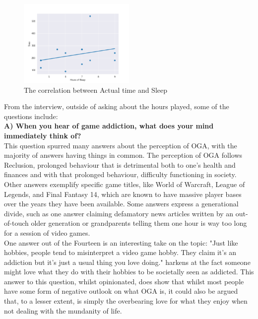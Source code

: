 \documentclass[conference]{IEEEtran}
\begin{document}
\begin{figure}[H]
\includegraphics[width = 0.5\textwidth]{Graph3}
\caption{The correlation between Actual time and Sleep}
\label{tab:figure8}
\end{figure}


From the interview, outside of asking about the hours played, some of the questions include:\\

 \textbf{A) When you hear of game addiction, what does your mind immediately think of?}\\

This question spurred many answers about the perception of OGA, with the majority of answers having things in common. The perception of OGA follows Reclusion, prolonged behaviour that is detrimental both to one's health and finances and with that prolonged behaviour, difficulty functioning in society. Other answers exemplify specific game titles, like World of Warcraft, League of Legends, and Final Fantasy 14, which are known to have massive player bases over the years they have been available. Some answers express a generational divide, such as one answer claiming defamatory news articles written by an out-of-touch older generation or grandparents telling them one hour is way too long for a session of video games.\\

One answer out of the Fourteen is an interesting take on the topic: "Just like hobbies, people tend to misinterpret a video game hobby. They claim it's an addiction but it's just a usual thing you love doing." harkens at the fact someone might love what they do with their hobbies to be societally seen as addicted. This answer to this question, whilst opinionated, does show that whilst most people have some form of negative outlook on what OGA is, it could also be argued that, to a lesser extent, is simply the overbearing love for what they enjoy when not dealing with the mundanity of life.\\
\end{document}
